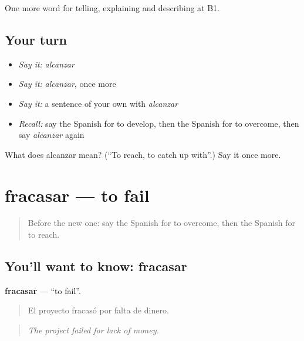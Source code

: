 \begin{grammarlens}[title={What you've built}]
One more word for telling, explaining and describing at B1.
\end{grammarlens}

\subsection*{Your turn}
\begin{itemize}
\raggedright
  \item \emph{Say it:} \emph{alcanzar}
  \item \emph{Say it:} \emph{alcanzar}, once more
  \item \emph{Say it:} a sentence of your own with \emph{alcanzar}
  \item \emph{Recall:} say the Spanish for to develop, then the Spanish for to overcome, then say \emph{alcanzar} again
\end{itemize}

\begin{tcolorbox}[breakable,colback=teal!4,colframe=teal!35!black,title={Before you move on}]
What does alcanzar mean? (\textquotedblleft{}To reach, to catch up with\textquotedblright{}.) Say it once more.
\end{tcolorbox}
\section[fracasar]{fracasar — to fail}

\label{lesson:ES-C573-fracasar}



\begin{quote}
Before the new one: say the Spanish for to overcome, then the Spanish for to reach.
\end{quote}

\subsection*{You'll want to know: fracasar}
\textbf{fracasar} — \textquotedblleft{}to fail\textquotedblright{}.

\begin{quote}
El proyecto fracasó por falta de dinero.
\end{quote}

\begin{quote}
\emph{The project failed for lack of money.}
\end{quote}

